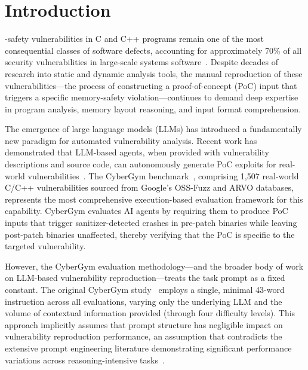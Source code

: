\documentclass{ieeeaccess}
\begin{document}
\section{Introduction}
\label{sec:introduction}

-safety vulnerabilities in C and C++ programs remain one of the most consequential classes of software defects, accounting for approximately 70\% of all security vulnerabilities in large-scale systems software~\cite{chromium_memory_safety}. Despite decades of research into static and dynamic analysis tools, the manual reproduction of these vulnerabilities---the process of constructing a proof-of-concept (PoC) input that triggers a specific memory-safety violation---continues to demand deep expertise in program analysis, memory layout reasoning, and input format comprehension.

The emergence of large language models (LLMs) has introduced a fundamentally new paradigm for automated vulnerability analysis. Recent work has demonstrated that LLM-based agents, when provided with vulnerability descriptions and source code, can autonomously generate PoC exploits for real-world vulnerabilities~\cite{cybergym}. The CyberGym benchmark~\cite{cybergym}, comprising 1,507 real-world C/C++ vulnerabilities sourced from Google's OSS-Fuzz and ARVO databases, represents the most comprehensive execution-based evaluation framework for this capability. CyberGym evaluates AI agents by requiring them to produce PoC inputs that trigger sanitizer-detected crashes in pre-patch binaries while leaving post-patch binaries unaffected, thereby verifying that the PoC is specific to the targeted vulnerability.

However, the CyberGym evaluation methodology---and the broader body of work on LLM-based vulnerability reproduction---treats the task prompt as a fixed constant. The original CyberGym study~\cite{cybergym} employs a single, minimal 43-word instruction across all evaluations, varying only the underlying LLM and the volume of contextual information provided (through four difficulty levels). This approach implicitly assumes that prompt structure has negligible impact on vulnerability reproduction performance, an assumption that contradicts the extensive prompt engineering literature demonstrating significant performance variations across reasoning-intensive tasks~\cite{wei2022cot, brown2020fewshot, zhou2023leasttomost}.
\end{document}
